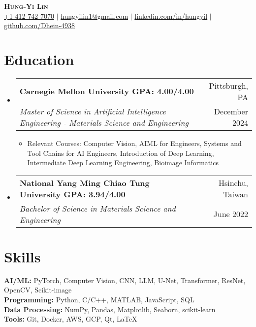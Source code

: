\documentclass[a4paper,11pt]{article}
\makeatletter
\newcommand{\resumeItem}[1]{
  \item\small{
    {#1 \vspace{-2pt}}
  }
}
\newcommand{\resumeDoubleHeading}[4]{
  \vspace{-2pt}\item
    \begin{tabular*}{0.97\textwidth}[t]{l@{\extracolsep{\fill}}r}
        \textbf{#1} & #2 \\
        \textit{\small#3} & {\small #4} \\
    \end{tabular*}\vspace{-5pt}
}
\newcommand{\resumeSubHeadingListStart}{\begin{itemize}[leftmargin=0.15in, label={}]}
\newcommand{\resumeSubHeadingListEnd}{\end{itemize}}
\makeatother
\begin{document}

\begin{center}
    \textbf{\Huge \scshape Hung-Yi Lin} \\ \vspace{3pt}
    \small
    \faMobile \hspace{.5pt} \href{tel:14127427070}{+1 412 742 7070}
    $|$
    \faAt \hspace{.5pt} \href{mailto:hungyilin1@gmail.com}{hungyilin1@gmail.com}
    $|$
    \faLinkedinSquare \hspace{.5pt} \href{https://www.linkedin.com/in/hungyil}{linkedin.com/in/hungyil}
    $|$
    \faGithub \hspace{.5pt} \href{https://github.com/Dhein-4938}{github.com/Dhein-4938}
\end{center}



\section{Education}
\vspace{3pt}
\resumeSubHeadingListStart
    \resumeDoubleHeading
      {Carnegie Mellon University \textnormal{\small GPA: 4.00/4.00}}{Pittsburgh, PA}
      {Master of Science in Artificial Intelligence Engineering - Materials Science and Engineering}{December 2024}
    \resumeSubHeadingListStart
        \resumeItem{Relevant Courses: Computer Vision, AIML for Engineers, Systems and Tool Chains for AI Engineers, Introduction of Deep Learning, Intermediate Deep Learning Engineering, Bioimage Informatics}
    \resumeSubHeadingListEnd
    \resumeDoubleHeading
      {National Yang Ming Chiao Tung University  \textnormal{\small GPA: 3.94/4.00}}{Hsinchu, Taiwan}
      {Bachelor of Science in Materials Science and Engineering}{June 2022}
\resumeSubHeadingListEnd


\section{Skills}
  \vspace{2pt}
  \resumeSubHeadingListStart
    \small{\item{
        \textbf{AI/ML:}{ PyTorch, Computer Vision, CNN, LLM, U-Net, Transformer, ResNet, OpenCV, Scikit-image } \\
        \vspace{3pt}
        \textbf{Programming:}{ Python, C/C++, MATLAB, JavaScript, SQL } \\ 
        \vspace{3pt}
        \textbf{Data Processing:}{ NumPy, Pandas, Matplotlib, Seaborn, scikit-learn } \\ 
        \vspace{3pt}
        \textbf{Tools:}{ Git, Docker, AWS, GCP, Qt, LaTeX } \\
    }}
  \resumeSubHeadingListEnd
\end{document}
